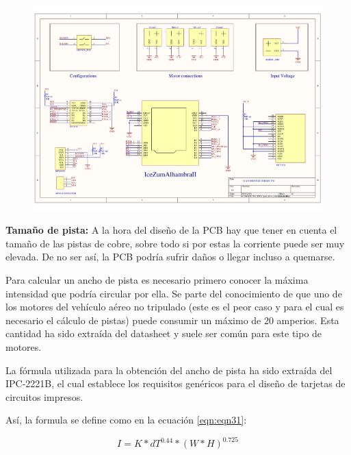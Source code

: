\begin{center}
	\begin{figure}[H]
		\center
		\includegraphics[scale=0.8, angle=90]{imagenes/Balancing_Robot/pcb_dron_schematic.pdf}
		\caption{}
		\label{fig:schematics_tfg}
	\end{figure}
\end{center}
\newpage

\textbf{Tamaño de pista: } \newline
A la hora del diseño de la PCB hay que tener en cuenta el tamaño de las pistas de cobre, sobre todo si por estas la corriente puede ser muy elevada. De no ser así, la PCB podría sufrir daños o llegar incluso a quemarse. \newline

Para calcular un ancho de pista es necesario primero conocer la máxima intensidad que podría circular por ella. Se parte del conocimiento de que uno de los motores del vehículo aéreo no tripulado (este es el peor caso y para el cual es necesario el cálculo de pistas) puede consumir un máximo de 20 amperios. Esta cantidad ha sido extraída del datasheet y suele ser común para este tipo de motores. \newline

La fórmula utilizada para la obtención del ancho de pista ha sido extraída del IPC-2221B, el cual establece los requisitos genéricos para el diseño de tarjetas de circuitos impresos. \newline

Así, la formula se define como en la ecuación \ref{eqn:eqn31}: 

\begin{equation}
I = K * dT^{0.44}*(W*H)^{0.725}
\label{eqn:eqn31}
\end{equation}

